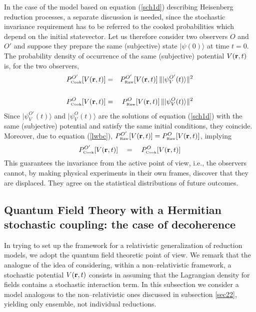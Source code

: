 \documentclass[10pt,a4paper]{article}
\begin{document}
In the case of the model based on equation (\ref{sch1d})
describing Heisenberg reduction processes, a separate discussion
is needed, since the stochastic invariance requirement has to be
referred to the cooked probabilities which depend on the initial
statevector. Let us therefore consider two observers $O$ and $O'$
and suppose they prepare the same (subjective) state
$|\psi(0)\rangle$ at time $t = 0$. The probability density of
occurrence of the same (subjective) potential $V({\bf r}, t)$ is,
for the two observers,
\begin{eqnarray}
P_{\makebox{\tiny Cook}}^{O'}[V({\bf r}, t)] & = &
P_{\makebox{\tiny Raw}}^{O'}[V({\bf r}, t)]\,
\| |\psi_{V}^{O'}(t)\rangle \|^{2} \nonumber \\
& & \\
P_{\makebox{\tiny Cook}}^{O}[V({\bf r}, t)] & = &
P_{\makebox{\tiny Raw}}^{O}[V({\bf r}, t)]\, \|
|\psi_{V}^{O}(t)\rangle \|^{2} \nonumber
\end{eqnarray}
Since $|\psi_{V}^{O'}(t)\rangle$ and $|\psi_{V}^{O}(t)\rangle$ are
the solutions of equation (\ref{sch1d}) with the same (subjective)
potential and satisfy the same initial conditions, they coincide.
Moreover, due to equation (\ref{lwbc}), $P_{\makebox{\tiny
Raw}}^{O'}[V({\bf r}, t)] = P_{\makebox{\tiny Raw}}^{O}[V({\bf r},
t)]$, implying
\begin{equation}
P_{\makebox{\tiny Cook}}^{O'}[V({\bf r}, t)] \quad = \quad
P_{\makebox{\tiny Cook}}^{O}[V({\bf r}, t)]
\end{equation}
This guarantees the invariance from the active point of view,
i.e., the observers cannot, by making physical experiments in
their own frames, discover that they are displaced. They agree on
the statistical distributions of future outcomes.

\subsection{Quantum Field Theory with a Hermitian stochastic
coupling: the case of decoherence} \label{sec92}

In trying to set up the framework for a relativistic
generalization of reduction models, we adopt the quantum field
theoretic point of view. We remark that the analogue of the idea
of considering, within a non--relativistic framework, a stochastic
potential $V({\bf r}, t)$ consists in assuming that the Lagrangian
density for fields contains a stochastic interaction term. In this
subsection we consider a model analogous to the non--relativistic
ones discussed in subsection \ref{sec22}, yielding only ensemble,
not individual reductions.
\end{document}
